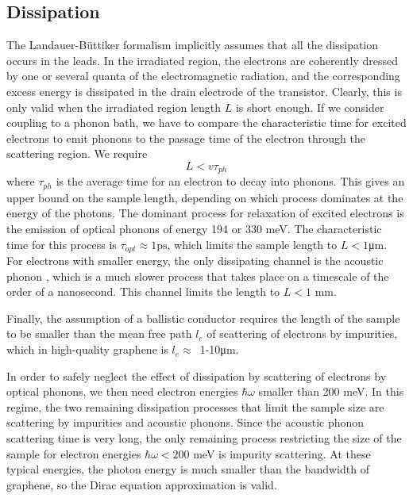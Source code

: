\documentclass[aps,prb,showpacs,superscriptaddress,twocolumn,10pt,floatfix]{revtex4-1}
\begin{document}
\subsection{Dissipation}

The Landauer-B\"{u}ttiker formalism implicitly assumes that all the dissipation occurs in the leads. In the irradiated region, the electrons are coherently dressed by one or several quanta of the electromagnetic radiation, and the corresponding excess energy is dissipated in the drain electrode of the transistor. Clearly, this is only valid when the irradiated region length $L$ is short enough. If we consider coupling to a phonon bath, we have to compare the characteristic time for excited electrons to emit phonons to the passage time of the electron through the scattering region. We require
\begin{equation}
L< v\tau_{ph}
\end{equation}
where $\tau_{ph}$ is the average time for an electron to decay into phonons. This gives an upper bound on the sample length, depending on which process dominates at the energy of the photons.
The dominant process for relaxation of excited electrons is the emission of optical phonons of energy 194 or 330 meV\cite{Sun2008}. The characteristic time for this process is $\tau_{opt}\approx1\text{ps}$, which limits the sample length to $L<1$\si{\micro\meter}.
For electrons with smaller energy, the only dissipating channel is the acoustic phonon \cite{Tse2009,Bistritzer2009}, which is a much slower process that takes place on a timescale of the order of a nanosecond\cite{Bistritzer2009}. This channel limits the length to $L<1$ mm.

Finally, the assumption of a ballistic conductor requires the length of the sample to be smaller than the mean free path $l_e$ of scattering of electrons by impurities, which in high-quality graphene is $l_e \approx \,$ 1-10\si{\micro\meter}.

In order to safely neglect the effect of dissipation by scattering of electrons by optical phonons, we then need electron energies $\hbar\omega$ smaller than 200 meV. In this regime, the two remaining dissipation processes that limit the sample size are scattering by impurities and acoustic phonons. Since the acoustic phonon scattering time is very long, the only remaining process restricting the size of the sample for electron energies $\hbar\omega<200$ meV is impurity scattering.
At these typical energies, the photon energy is much smaller than the bandwidth of graphene, so the Dirac equation approximation is valid.
\end{document}
